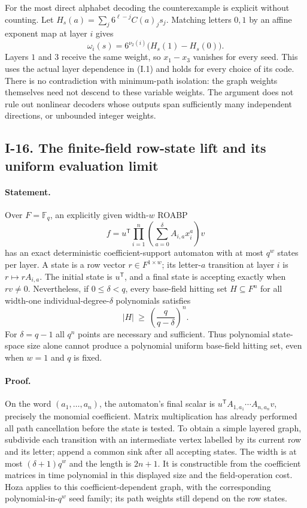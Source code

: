\documentclass[11pt,a4paper]{article}
\theoremstyle{definition}\newtheorem{definition}{Definition}
\begin{document}
For the most direct alphabet decoding the counterexample is explicit
without counting.  Let
$H_s(a)=\sum_j6^{\ell-j}C(a)_js_j$.  Matching letters $0,1$ by
an affine exponent map at layer $i$ gives
\[
 \omega_i(s)=6^{\nu_2(i)}\bigl(H_s(1)-H_s(0)\bigr).
\]
Layers $1$ and $3$ receive the same weight, so $x_1-x_3$ vanishes
for every seed.  This uses the actual layer dependence in (I.1)
and holds for every choice of its code.  There is no contradiction
with minimum-path isolation: the graph weights themselves need not
descend to these variable weights.  The argument does not rule out
nonlinear decoders whose outputs span sufficiently many independent
directions, or unbounded integer weights.

\subsection{I-16. The finite-field row-state lift and its uniform evaluation limit}
\label{I-16}

\paragraph{Statement.}
Over $F=\mathbb F_q$, an explicitly given width-$w$ ROABP
\[
 f=u^{\mathsf T}\prod_{i=1}^n
       \left(\sum_{a=0}^{\delta}A_{i,a}x_i^a\right)v
\]
has an exact deterministic coefficient-support automaton with
at most $q^w$ states per layer.  A state is a row vector
$r\in F^{1\times w}$; its letter-$a$ transition at layer $i$ is
$r\mapsto rA_{i,a}$.  The initial state is $u^{\mathsf T}$, and
a final state is accepting exactly when $rv\ne0$.
Nevertheless, if $0\le\delta<q$, every base-field hitting set
$H\subseteq F^n$ for all width-one individual-degree-$\delta$
polynomials satisfies
\[
 |H|\ \ge\ \left(\frac{q}{q-\delta}\right)^n.
\tag{I.16}\label{eq:I-small-field-lower}
\]
For $\delta=q-1$ all $q^n$ points are necessary and sufficient.
Thus polynomial state-space size alone cannot produce a polynomial
uniform base-field hitting set, even when $w=1$ and $q$ is fixed.

\paragraph{Proof.}
On the word $(a_1,\ldots,a_n)$, the automaton's final scalar is
$u^{\mathsf T}A_{1,a_1}\cdots A_{n,a_n}v$, precisely the monomial
coefficient.  Matrix multiplication has already performed all path
cancellation before the state is tested.  To obtain a simple layered
graph, subdivide each transition with an intermediate vertex labelled
by its current row and its letter; append a common sink after all
accepting states.  The width is at most $(\delta+1)q^w$ and the
length is $2n+1$.  It is constructible from the coefficient matrices
in time polynomial in this displayed size and the field-operation
cost.  Hoza applies to this coefficient-dependent graph, with the
corresponding polynomial-in-$q^w$ seed family; its path weights
still depend on the row states.
\end{document}
